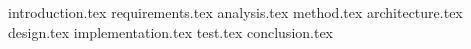 

{introduction.tex}
{requirements.tex}
{analysis.tex}
{method.tex}
{architecture.tex}
{design.tex}
{implementation.tex}
{test.tex}
{conclusion.tex}

%
